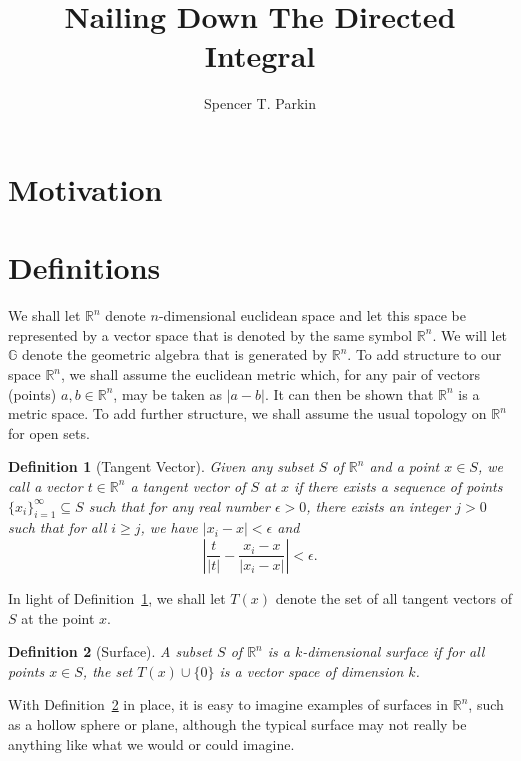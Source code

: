 \documentclass[12pt]{article}
\title{Nailing Down The Directed Integral}
\author{Spencer T. Parkin}
\numberwithin{equation}{section}
\newcommand{\G}{\mathbb{G}}
\newcommand{\R}{\mathbb{R}}
\newtheorem{definition}{Definition}[section]
\begin{document}
\maketitle

\section{Motivation}


\section{Definitions}

We shall let $\R^n$ denote $n$-dimensional euclidean space and let this space be
represented by a vector space that is denoted by the same symbol $\R^n$.
We will let $\G$ denote the geometric algebra that is generated by $\R^n$.
To add structure to our space $\R^n$, we shall assume the euclidean metric
which, for any pair of vectors (points) $a,b\in\R^n$, may be taken as $|a-b|$.
It can then be shown that $\R^n$ is a metric space.  To add further structure,
we shall assume the usual topology on $\R^n$ for open sets.

\begin{definition}[Tangent Vector]\label{def_tangent_vector}
Given any subset $S$ of $\R^n$ and a point $x\in S$, we call a vector $t\in\R^n$
a tangent vector of $S$ at $x$ if there exists a sequence of points $\{x_i\}_{i=1}^\infty\subseteq S$
such that for any real number $\epsilon>0$, there exists an integer $j>0$ such that
for all $i\geq j$, we have $|x_i-x|<\epsilon$ and
\begin{equation*}
\left|\frac{t}{|t|} - \frac{x_i-x}{|x_i-x|}\right|<\epsilon.
\end{equation*}
\end{definition}

In light of Definition~\ref{def_tangent_vector}, we shall let
$T(x)$ denote the set of all tangent vectors of $S$ at the point $x$.

\begin{definition}[Surface]\label{def_surface}
A subset $S$ of $\R^n$ is a $k$-dimensional surface if for all points $x\in S$, the set
$T(x)\cup\{0\}$ is a vector space of dimension $k$.
\end{definition}

With Definition~\ref{def_surface} in place, it is easy to imagine examples of surfaces in $\R^n$,
such as a hollow sphere or plane,
although the typical surface may not really be anything like what we would or could imagine.
\end{document}
